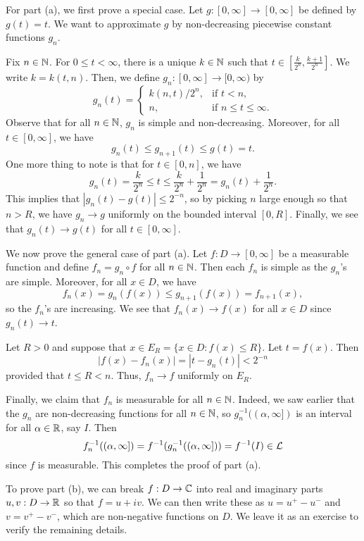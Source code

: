 \begin{pf}
    For part (a), we first prove a special case. Let $g : [0, \infty] 
    \to [0, \infty]$ be defined by $g(t) = t$. We want to approximate 
    $g$ by non-decreasing piecewise constant functions $g_n$. 
    
    Fix $n \in \mathbb{N}$. For $0 \leq t < \infty$, there is a unique $k \in \mathbb{N}$ 
    such that $t \in [\frac{k}{2^n}, \frac{k+1}{2^n}]$. We write 
    $k = k(t, n)$. Then, we define $g_n : [0, \infty] \to [0, \infty)$ by 
    \[ g_n(t) = \begin{cases}
        k(n, t)/2^n, & \text{if } t < n, \\ 
        n, & \text{if } n \leq t \leq \infty. 
    \end{cases} \]
    Observe that for all $n \in \mathbb{N}$, $g_n$ is simple and non-decreasing. 
    Moreover, for all $t \in [0, \infty]$, we have 
    \[ g_n(t) \leq g_{n+1}(t) \leq g(t) = t. \] 
    One more thing to note is that for $t \in [0, n]$, we have 
    \[ g_n(t) = \frac{k}{2^n} \leq t \leq \frac{k}{2^n} + \frac{1}{2^n}
    = g_n(t) + \frac{1}{2^n}. \]  
    This implies that $|g_n(t) - g(t)| \leq 2^{-n}$, so by picking 
    $n$ large enough so that $n > R$, we have $g_n \to g$ uniformly on 
    the bounded interval $[0, R]$. Finally, we see that $g_n(t) \to g(t)$ 
    for all $t \in [0, \infty]$. 

    We now prove the general case of part (a). Let $f : D \to [0, \infty]$ 
    be a measurable function and define $f_n = g_n \circ f$ for all 
    $n \in \mathbb{N}$. Then each $f_n$ is simple as the $g_n$'s are simple. 
    Moreover, for all $x \in D$, we have 
    \[ f_n(x) = g_n(f(x)) \leq g_{n+1}(f(x)) = f_{n+1}(x), \] 
    so the $f_n$'s are increasing. We see that $f_n(x) \to f(x)$ for all 
    $x \in D$ since $g_n(t) \to t$. 

    Let $R > 0$ and suppose that $x \in E_R = \{x \in D : f(x) \leq R\}$. 
    Let $t = f(x)$. Then 
    \[ |f(x) - f_n(x)| = |t - g_n(t)| < 2^{-n} \] 
    provided that $t \leq R < n$. Thus, $f_n \to f$ uniformly on $E_R$. 

    Finally, we claim that $f_n$ is measurable for all $n \in \mathbb{N}$. 
    Indeed, we saw earlier that the $g_n$ are non-decreasing functions for all 
    $n \in \mathbb{N}$, so $g_n^{-1}((\alpha, \infty])$ is an interval for all 
    $\alpha \in \mathbb{R}$, say $I$. Then 
    \[ f_n^{-1}((\alpha, \infty]) = f^{-1}(g_n^{-1}((\alpha, \infty])) 
    = f^{-1}(I) \in {\cal L} \] 
    since $f$ is measurable. This completes the proof of part (a). 

    To prove part (b), we can break $f : D \to \mathbb{C}$ into real and imaginary parts 
    $u, v : D \to \mathbb{R}$ so that $f = u + iv$. We can then write these as 
    $u = u^+ - u^-$ and $v = v^+ - v^-$, which are non-negative functions on 
    $D$. We leave it as an exercise to verify the remaining details. 
\end{pf}
